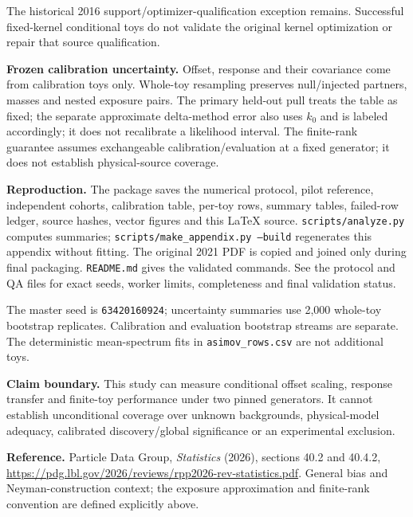 \documentclass[10pt]{article}
\begin{document}
The historical 2016 support/optimizer-qualification exception remains. Successful fixed-kernel conditional toys do not validate the original kernel optimization or repair that source qualification.

\textbf{Frozen calibration uncertainty.} Offset, response and their covariance come from calibration toys only. Whole-toy resampling preserves null/injected partners, masses and nested exposure pairs. The primary held-out pull treats the table as fixed; the separate approximate delta-method error also uses $k_0$ and is labeled accordingly; it does not recalibrate a likelihood interval. The finite-rank guarantee assumes exchangeable calibration/evaluation at a fixed generator; it does not establish physical-source coverage.

\textbf{Reproduction.} The package saves the numerical protocol, pilot reference, independent cohorts, calibration table, per-toy rows, summary tables, failed-row ledger, source hashes, vector figures and this LaTeX source. \texttt{scripts/analyze.py} computes summaries; \texttt{scripts/make\_appendix.py --build} regenerates this appendix without fitting. The original 2021 PDF is copied and joined only during final packaging. \texttt{README.md} gives the validated commands. See the protocol and QA files for exact seeds, worker limits, completeness and final validation status.

The master seed is \texttt{63420160924}; uncertainty summaries use 2,000 whole-toy bootstrap replicates. Calibration and evaluation bootstrap streams are separate. The deterministic mean-spectrum fits in \texttt{asimov\_rows.csv} are not additional toys.

\textbf{Claim boundary.} This study can measure conditional offset scaling, response transfer and finite-toy performance under two pinned generators. It cannot establish unconditional coverage over unknown backgrounds, physical-model adequacy, calibrated discovery/global significance or an experimental exclusion.

\textbf{Reference.} Particle Data Group, \emph{Statistics} (2026), sections 40.2 and 40.4.2, \url{https://pdg.lbl.gov/2026/reviews/rpp2026-rev-statistics.pdf}. General bias and Neyman-construction context; the exposure approximation and finite-rank convention are defined explicitly above.
\end{document}
